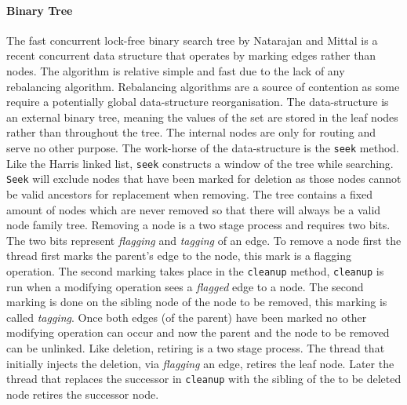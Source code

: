 \paragraph{Binary Tree} The fast concurrent lock-free binary search tree by Natarajan and Mittal is a recent concurrent data structure that operates by marking edges rather than nodes.\cite{LFBinaryTree} The algorithm is relative simple and fast due to the lack of any rebalancing algorithm. Rebalancing algorithms are a source of contention as some require a potentially global data-structure reorganisation. The data-structure is an external binary tree, meaning the values of the set are stored in the leaf nodes rather than throughout the tree. The internal nodes are only for routing and serve no other purpose. The work-horse of the data-structure is the \texttt{seek} method. Like the Harris linked list, \texttt{seek} constructs a window of the tree while searching. \texttt{Seek} will exclude nodes that have been marked for deletion as those nodes cannot be valid ancestors for replacement when removing. The tree contains a fixed amount of nodes which are never removed so that there will always be a valid node family tree. Removing a node is a two stage process and requires two bits. The two bits represent \textit{flagging} and \textit{tagging} of an edge. To remove a node first the thread first marks the parent's edge to the node, this mark is a flagging operation. The second marking takes place in the \texttt{cleanup} method, \texttt{cleanup} is run when a modifying operation sees a \textit{flagged} edge to a node. The second marking is done on the sibling node of the node to be removed, this marking is called \textit{tagging}. Once both edges (of the parent) have been marked no other modifying operation can occur and now the parent and the node to be removed can be unlinked. Like deletion, retiring is a two stage process. The thread that initially injects the deletion, via \textit{flagging} an edge, retires the leaf node. Later the thread that replaces the successor in \texttt{cleanup} with the sibling of the to be deleted node retires the successor node.


